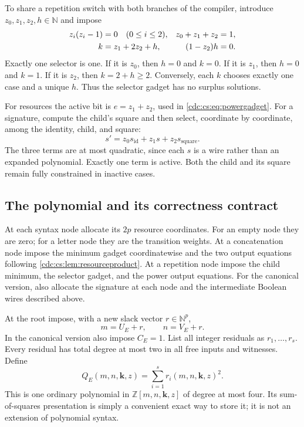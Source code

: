 \documentclass[11pt,a4paper]{article}
\theoremstyle{definition}
\theoremstyle{remark}
\newcommand{\N}{\mathbb N}
\newcommand{\Z}{\mathbb Z}
\begin{document}
To share a repetition switch with both branches of the compiler, introduce
$z_0,z_1,z_2,h\in\N$ and impose
\begin{align}
\label{cdc:cs:eq:threeway}
z_i(z_i-1)&=0\quad(0\leq i\leq2),&
 z_0+z_1+z_2&=1,\\
k&=z_1+2z_2+h,&(1-z_2)h&=0.
\notag
\end{align}
Exactly one selector is one. If it is $z_0$, then $h=0$ and $k=0$. If it is
$z_1$, then $h=0$ and $k=1$. If it is $z_2$, then $k=2+h\geq2$. Conversely,
each $k$ chooses exactly one case and a unique $h$. Thus the selector gadget
has no surplus solutions.

For resources the active bit is $e=z_1+z_2$, used in
\eqref{cdc:cs:eq:powergadget}. For a signature, compute the child's square and then
select, coordinate by coordinate, among the identity, child, and square:
\begin{equation}
\label{cdc:cs:eq:signatureselection}
s'=z_0 s_{\mathrm{id}}+z_1s+z_2s_{\mathrm{square}}.
\end{equation}
The three terms are at most quadratic, since each $s$ is a wire rather than
an expanded polynomial. Exactly one term is active. Both the child and its
square remain fully constrained in inactive cases.

\subsection{The polynomial and its correctness contract}

At each syntax node allocate its $2p$ resource coordinates. For an empty
node they are zero; for a letter node they are the transition weights. At a
concatenation node impose the minimum gadget coordinatewise and the two
output equations following \cref{cdc:cs:lem:resourceproduct}. At a repetition node
impose the child minimum, the selector gadget, and the power output equations.
For the canonical version, also allocate the signature at each node and the
intermediate Boolean wires described above.

At the root impose, with a new slack vector $r\in\N^p$,
\begin{equation}
\label{cdc:cs:eq:endpoint}
m=U_E+r,\qquad n=V_E+r.
\end{equation}
In the canonical version also impose $C_E=1$. List all integer residuals as
$r_1,\ldots,r_s$. Every residual has total degree at most two in all free
inputs and witnesses. Define
\begin{equation}
\label{cdc:cs:eq:compiledpoly}
Q_E(m,n,\mathbf{k},z)=\sum_{i=1}^s r_i(m,n,\mathbf{k},z)^2.
\end{equation}
This is one ordinary polynomial in $\Z[m,n,\mathbf{k},z]$ of degree at most
four. Its sum-of-squares presentation is simply a convenient exact way to
store it; it is not an extension of polynomial syntax.
\end{document}
